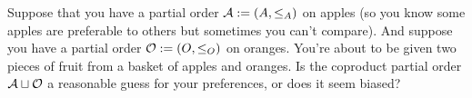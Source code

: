 \documentclass[CT4S-EN-RU]{subfiles}
\begin{document}
\begin{exampleRUS}
\end{exampleRUS}

\begin{exerciseENG}
Suppose that you have a partial order $\mathcal{A}:=(A,\leq_A)$ on apples (so you know some apples are preferable to others but sometimes you can't compare). And suppose you have a partial order $\mathcal{O}:=(O,\leq_O)$ on oranges. You're about to be given two pieces of fruit from a basket of apples and oranges. Is the coproduct partial order $\mathcal{A}\sqcup\mathcal{O}$ a reasonable guess for your preferences, or does it seem biased?
\end{exerciseENG}

\begin{exerciseRUS}
\end{exerciseRUS}
\end{document}
